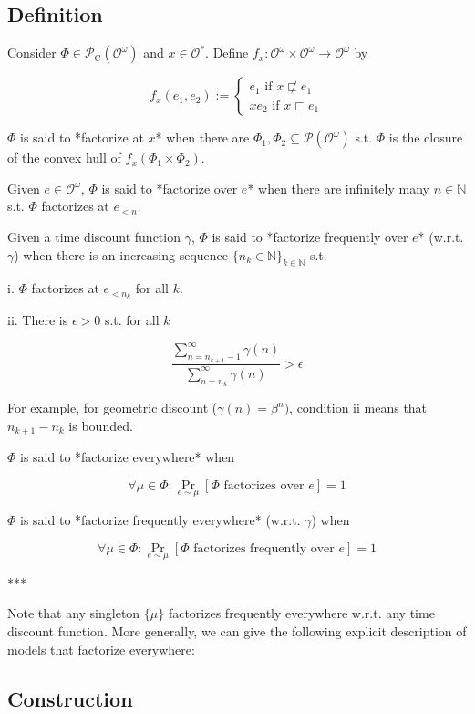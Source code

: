 \documentclass[a4paper]{article}
\DeclareMathOperator{\Prb}{Pr}
\newcommand{\Nats}{\mathbb{N}}
\newcommand{\Prob}{\mathcal{P}}
\newcommand{\Obs}{\mathcal{O}}
\newcommand{\ObsO}{\Obs^\omega}
\newcommand{\CC}{\mathcal{P}_{\operatorname{C}}}
\begin{document}
\subsection{Definition}

Consider ${\Phi \in \CC(\ObsO)}$ and ${x \in \Obs^*}$. Define ${f_x: \ObsO \times \ObsO \rightarrow \ObsO}$ by

$${f_x(e_1,e_2):=\begin{cases}e_1 \text{ if } x \not\sqsubset e_1 \\xe_2 \text{ if } x \sqsubset e_1\end{cases}}$$

${\Phi}$ is said to *factorize at ${x}$* when there are ${\Phi_1, \Phi_2 \subseteq \Prob(\ObsO)}$ s.t. ${\Phi}$ is the closure of the convex hull of ${f_x(\Phi_1 \times \Phi_2)}$.

Given ${e \in \ObsO}$, ${\Phi}$ is said to *factorize over ${e}$* when there are infinitely many ${n \in \Nats}$ s.t. ${\Phi}$ factorizes at ${e_{<n}}$.

Given a time discount function ${\gamma}$, ${\Phi}$ is said to *factorize frequently over ${e}$* (w.r.t. ${\gamma}$) when there is an increasing sequence ${\{n_k \in \Nats\}_{k \in \Nats}}$ s.t.

i. ${\Phi}$ factorizes at ${e_{<n_k}}$ for all ${k}$.

ii. There is ${\epsilon > 0}$ s.t. for all ${k}$

$$\frac{\sum_{n = n_{k+1}-1}^\infty \gamma(n)}{\sum_{n = n_{k}}^\infty \gamma(n)} > \epsilon$$

For example, for geometric discount (${\gamma(n)=\beta^n)}$, condition ii means that ${n_{k+1}-n_k}$  is bounded.

${\Phi}$ is said to *factorize everywhere* when 

$${\forall \mu \in \Phi: \Prb_{e \sim \mu}[\Phi \text{ factorizes over } e] = 1}$$

${\Phi}$ is said to *factorize frequently everywhere* (w.r.t. ${\gamma}$) when

$${\forall \mu \in \Phi: \Prb_{e \sim \mu}[\Phi \text{ factorizes frequently over } e] = 1}$$

***

Note that any singleton ${\{\mu\}}$ factorizes frequently everywhere w.r.t. any time discount function. More generally, we can give the following explicit description of models that factorize everywhere:

\subsection{Construction}
\end{document}

